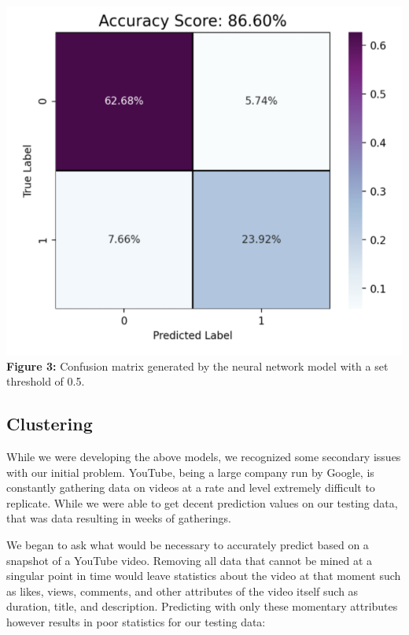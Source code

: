 \documentclass{article}
\begin{document}
\begin{center}
\includegraphics[scale=.65]{figure3.png}\\
\textbf{Figure 3:} Confusion matrix generated by the neural network model with a set threshold of 0.5.
\end{center}

\subsection*{Clustering}

\quad While we were developing the above models, we recognized some secondary issues with our initial problem. YouTube, being a large company run by Google, is constantly gathering data on videos at a rate and level extremely difficult to replicate. While we were able to get decent prediction values on our testing data, that was data resulting in weeks of gatherings. 
\par We began to ask what would be necessary to accurately predict based on a snapshot of a YouTube video. Removing all data that cannot be mined at a singular point in time would leave statistics about the video at that moment such as likes, views, comments, and other attributes of the video itself such as duration, title, and description. Predicting with only these momentary attributes however results in poor statistics for our testing data: \\
\end{document}
